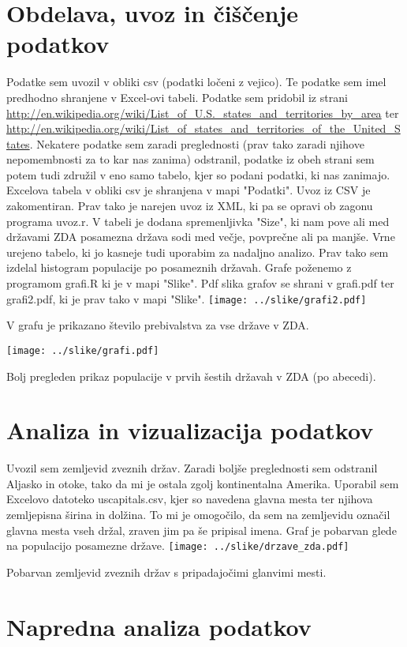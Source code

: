 \documentclass[11pt,a4paper]{article}
\begin{document}
\pagebreak

\section{Obdelava, uvoz in čiščenje podatkov}

Podatke sem uvozil v obliki csv (podatki ločeni z vejico). Te podatke sem imel predhodno shranjene v Excel-ovi tabeli. Podatke sem pridobil iz strani 
\url{http://en.wikipedia.org/wiki/List_of_U.S._states_and_territories_by_area} ter
\url{http://en.wikipedia.org/wiki/List_of_states_and_territories_of_the_United_States}. 
Nekatere podatke sem zaradi preglednosti (prav tako zaradi njihove nepomembnosti za to kar nas zanima) odstranil, podatke iz obeh strani sem potem tudi združil v eno samo tabelo, kjer so podani podatki, ki nas zanimajo. Excelova tabela v obliki csv je shranjena v mapi "Podatki".
Uvoz iz CSV je zakomentiran.
Prav tako je narejen uvoz iz XML, ki pa se opravi ob zagonu programa uvoz.r. V tabeli je dodana spremenljivka "Size", ki nam pove ali med državami ZDA posamezna država sodi med večje, povprečne ali pa manjše. Vrne urejeno tabelo, ki jo kasneje tudi uporabim za nadaljno analizo.
Prav tako sem izdelal histogram populacije po posameznih državah.
Grafe poženemo z programom grafi.R ki je v mapi "Slike". Pdf slika grafov se shrani v 
grafi.pdf ter grafi2.pdf,  ki je prav tako v mapi "Slike".
\vfill
\texttt{[image: ../slike/grafi2.pdf]}

V grafu je prikazano število prebivalstva za vse države v ZDA.


\texttt{[image: ../slike/grafi.pdf]}

Bolj pregleden prikaz populacije v prvih šestih državah v ZDA (po abecedi).

\pagebreak

\section{Analiza in vizualizacija podatkov}

Uvozil sem zemljevid zveznih držav. Zaradi boljše preglednosti sem odstranil Aljasko in otoke, tako da mi je ostala zgolj kontinentalna Amerika. Uporabil sem Excelovo datoteko uscapitals.csv, kjer so navedena glavna mesta ter njihova zemljepisna širina in dolžina. To mi je omogočilo, da sem na zemljevidu označil glavna mesta vseh držal, zraven jim pa še pripisal imena. Graf je pobarvan glede na populacijo posamezne države. 
\texttt{[image: ../slike/drzave\_zda.pdf]}

Pobarvan zemljevid zveznih držav s pripadajočimi glanvimi mesti.

\newpage
\section{Napredna analiza podatkov}
\end{document}
